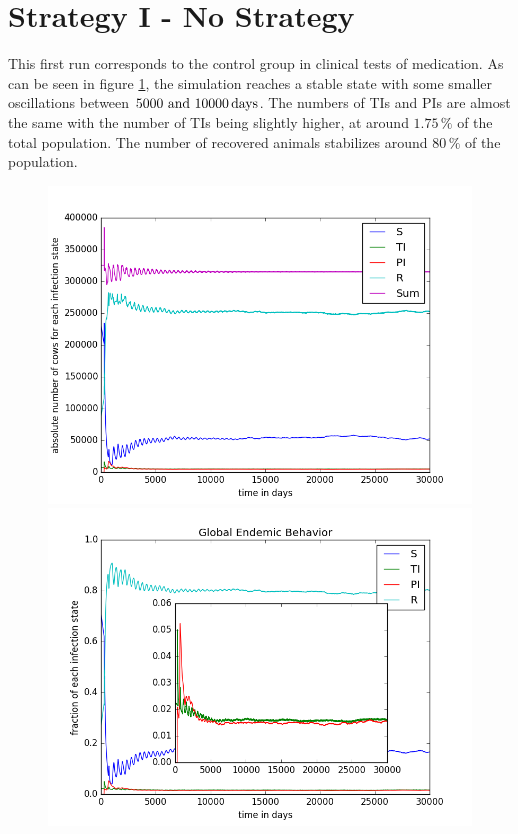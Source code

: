 \section{Strategy I - No Strategy}
This first run corresponds to the control group in clinical tests of medication. As can be seen in figure \ref{fig:cont1Behav}, the simulation reaches a stable state with some smaller oscillations between $5000\text{ and } 10000\days$. The numbers of TIs and PIs are almost the same with the number of TIs being slightly higher, at around $1.75\,\%$ of the total population. The number of recovered animals stabilizes around $80\,\%$ of the population. 
\begin{figure}[htbp]
\begin{minipage}{0.5\textwidth}
\centering
\noindent\includegraphics[width=0.95\linewidth,height=\textheight,
keepaspectratio]{cont1totalEndemicNumbers.png} 
\end{minipage}
\begin{minipage}{0.5\textwidth}
\centering
\noindent\includegraphics[width=0.95\linewidth,height=\textheight,
keepaspectratio]{cont1endemicFractions.png} 
\end{minipage}
\caption[Endemic Behavior in Containment Strategy One]{}
\label{fig:cont1Behav}
\end{figure} 


